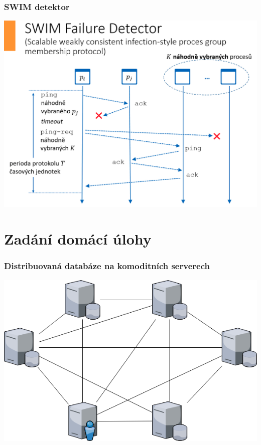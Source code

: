 \documentclass[usenames,dvipsnames,9pt]{beamer}
\begin{document}
\begin{frame}
  \frametitle{SWIM detektor}
  \begin{center}
  \includegraphics[width=\linewidth]{10/figs/swim.png}
  \end{center}
\end{frame}

\section{Zadání domácí úlohy}

\begin{frame}
  \frametitle{Distribuovaná databáze na komoditních serverech}
  \begin{center}
  \includegraphics[width=.95\linewidth]{10/figs/dist_db.png}
  \end{center}
\end{frame}
\end{document}
